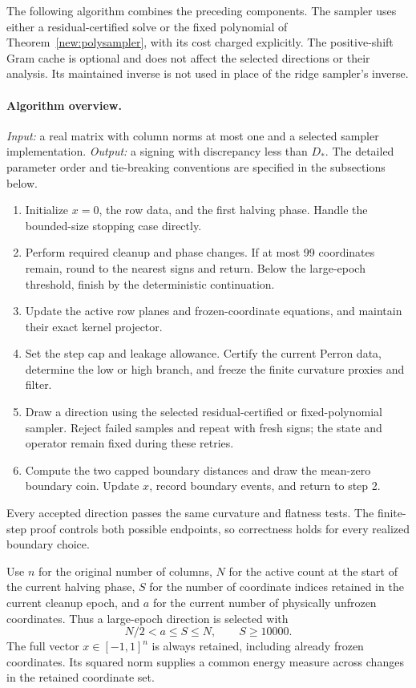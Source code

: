 \documentclass[11pt]{amsart}
\theoremstyle{definition}\newtheorem{definition}[theorem]{Definition}
\theoremstyle{remark}\newtheorem{remark}[theorem]{Remark}
\numberwithin{equation}{section}
\begin{document}
The following algorithm combines the preceding components. The sampler
uses either a residual-certified solve or the fixed polynomial of
Theorem~\ref{new:polysampler}, with its cost charged explicitly.
The positive-shift Gram cache is optional and does not affect the selected
directions or their analysis. Its maintained inverse is not used in place
of the ridge sampler's inverse.

\paragraph{Algorithm overview.}
\emph{Input:} a real matrix with column norms at most one and a selected
sampler implementation. \emph{Output:} a signing with discrepancy less
than $D_*$. The detailed parameter order and tie-breaking conventions
are specified in the subsections below.
\begin{enumerate}
\item Initialize $x=0$, the row data, and the first halving phase. Handle
the bounded-size stopping case directly.
\item Perform required cleanup and phase changes. If at most 99
coordinates remain, round to the nearest signs and return. Below the
large-epoch threshold, finish by the deterministic continuation.
\item Update the active row planes and frozen-coordinate equations, and
maintain their exact kernel projector.
\item Set the step cap and leakage allowance. Certify the current Perron
data, determine the low or high branch, and freeze the finite curvature
proxies and filter.
\item Draw a direction using the selected residual-certified or fixed-polynomial
sampler. Reject failed samples and repeat with fresh signs; the state and
operator remain fixed during these retries.
\item Compute the two capped boundary distances and draw the mean-zero
boundary coin. Update $x$, record boundary events, and return to step 2.
\end{enumerate}
Every accepted direction passes the same curvature and flatness tests.
The finite-step proof controls both possible endpoints, so correctness
holds for every realized boundary choice.

Use $n$ for the original number of columns, $N$ for the active count at the
start of the current halving phase, $S$ for the number of coordinate
indices retained in the current cleanup epoch, and $a$ for the current
number of physically unfrozen coordinates.  Thus a large-epoch direction
is selected with
\[
 N/2<a\le S\le N,\qquad S\ge10000.
\]
The full vector $x\in[-1,1]^n$ is always retained, including already frozen
coordinates. Its squared norm supplies a common energy measure across changes in
the retained coordinate set.
\end{document}
